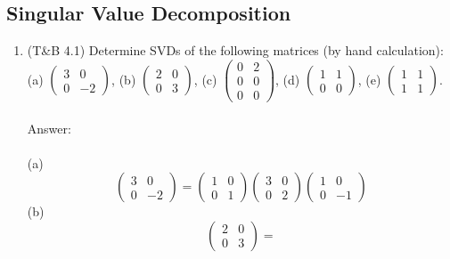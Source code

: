 \documentclass{article}
\begin{document}
\subsection*{Singular Value Decomposition}
\begin{enumerate}
\setcounter{enumi}{0}
\item (T\&B 4.1) Determine SVDs of the following matrices (by hand calculation):\\
(a) $\left( \begin{array}{cc} 3 & 0 \\ 0 & -2  \end{array} \right)$, \quad
(b) $\left( \begin{array}{cc} 2 & 0 \\ 0 &  3  \end{array} \right)$, \quad 
(c) $\left( \begin{array}{cc} 0 & 2 \\ 0 & 0 \\ 0 & 0  \end{array} \right)$,  \quad
(d) $\left( \begin{array}{cc} 1 & 1 \\ 0 & 0  \end{array} \right)$,  \quad
(e) $\left( \begin{array}{cc} 1 & 1 \\ 1 & 1  \end{array} \right)$.\\
\\
Answer:\\
\\
(a) 
$$\left( \begin{array}{cc} 3 & 0 \\ 0 & -2  \end{array} \right) = 
\left( \begin{array}{cc} 1 & 0 \\ 0 & 1  \end{array} \right)
\left( \begin{array}{cc} 3 & 0 \\ 0 & 2  \end{array} \right)
\left( \begin{array}{cc} 1 & 0 \\ 0 & -1  \end{array} \right)$$
(b) 
$$\left( \begin{array}{cc} 2 & 0 \\ 0 &  3  \end{array} \right) = 
$$
\end{enumerate}
\end{document}
